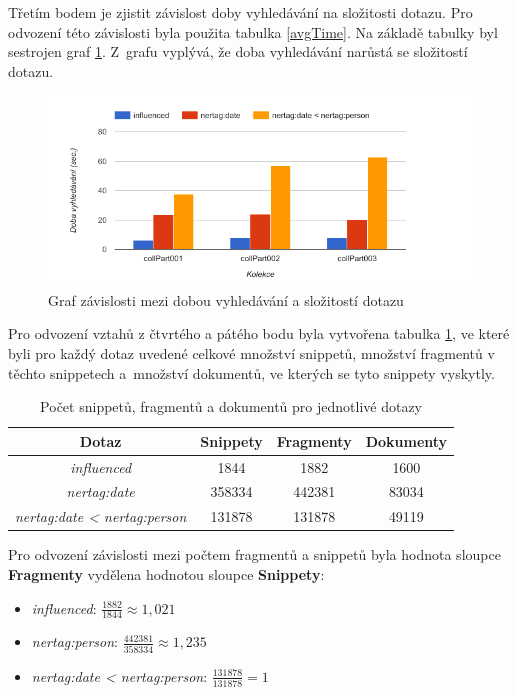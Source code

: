 Třetím bodem je zjistit závislost doby  vyhledávání na složitosti dotazu. Pro odvození této závislosti byla použita tabulka  \ref{avgTime}. Na základě tabulky byl sestrojen graf \ref{time_complex}. Z~grafu vyplývá, že doba vyhledávání narůstá se složitostí dotazu. 

\begin{figure}[H]
\includegraphics[scale=0.7]{obrazky-figures/time_complex.png}
\caption{Graf závislosti mezi dobou vyhledávání a složitostí dotazu}
\label{time_complex}
\end{figure}


Pro odvození vztahů z čtvrtého a pátého bodu byla  vytvořena  tabulka \ref{numbsStats}, ve které byli pro každý dotaz uvedené celkové množství snippetů, množství fragmentů v těchto snippetech a~množství dokumentů, ve kterých se tyto snippety vyskytly.  

\begin{table}[H]
\centering
\begin{tabular}{|c|c|c|c|}
\hline
\textbf{Dotaz} & \textbf{Snippety} & \textbf{Fragmenty} & \textbf{Dokumenty} \\
\hline
\emph{influenced} & 1844 & 1882 & 1600\\
\hline
\emph{nertag:date} & 358334 & 442381 & 83034 \\
\hline
\emph{nertag:date < nertag:person} & 131878 & 131878 & 49119 \\
\hline
\end{tabular}
\caption{Počet snippetů, fragmentů a dokumentů pro jednotlivé dotazy}
\label{numbsStats}
\end{table}


Pro odvození závislosti mezi počtem fragmentů a snippetů byla hodnota sloupce \textbf{Fragmenty} vydělena hodnotou sloupce \textbf{Snippety}:


\begin{itemize}
\item \emph{influenced}: $\frac{1882}{1844} \approx 1,021 $

\item \emph{nertag:person}: $\frac{442381}{358334} \approx 1,235$

\item \emph{nertag:date < nertag:person}: $\frac{131878}{131878} = 1$
\end{itemize}



